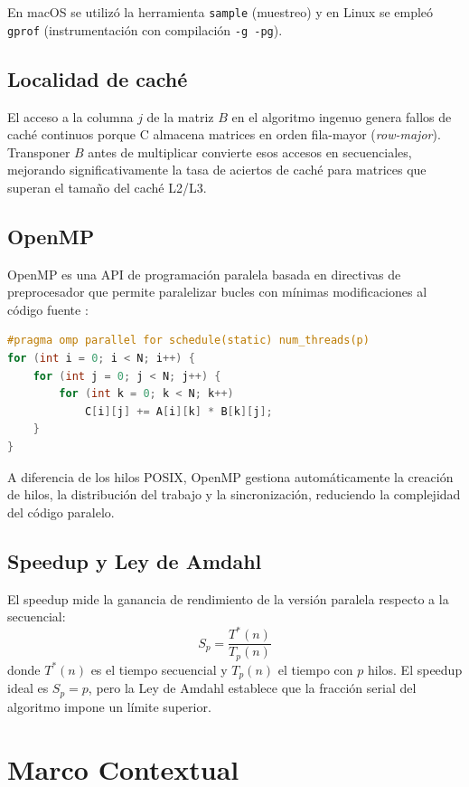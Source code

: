 \documentclass{article}
\begin{document}
En macOS se utilizó la herramienta \texttt{sample} (muestreo) y en Linux se empleó \texttt{gprof} (instrumentación con compilación \texttt{-g -pg}).

\subsection{Localidad de caché}

El acceso a la columna $j$ de la matriz $B$ en el algoritmo ingenuo genera fallos de caché continuos porque C almacena matrices en orden fila-mayor (\emph{row-major}). Transponer $B$ antes de multiplicar convierte esos accesos en secuenciales, mejorando significativamente la tasa de aciertos de caché para matrices que superan el tamaño del caché L2/L3.

\subsection{OpenMP}

OpenMP es una API de programación paralela basada en directivas de preprocesador que permite paralelizar bucles con mínimas modificaciones al código fuente \cite{openmp}:

\begin{lstlisting}[language=C]
#pragma omp parallel for schedule(static) num_threads(p)
for (int i = 0; i < N; i++) {
    for (int j = 0; j < N; j++) {
        for (int k = 0; k < N; k++)
            C[i][j] += A[i][k] * B[k][j];
    }
}
\end{lstlisting}

A diferencia de los hilos POSIX, OpenMP gestiona automáticamente la creación de hilos, la distribución del trabajo y la sincronización, reduciendo la complejidad del código paralelo.

\subsection{Speedup y Ley de Amdahl}

El speedup mide la ganancia de rendimiento de la versión paralela respecto a la secuencial:
\[ S_p = \frac{T^*(n)}{T_p(n)} \]
donde $T^*(n)$ es el tiempo secuencial y $T_p(n)$ el tiempo con $p$ hilos. El speedup ideal es $S_p = p$, pero la Ley de Amdahl \cite{amdahl} establece que la fracción serial del algoritmo impone un límite superior.

\section{Marco Contextual}
\end{document}
